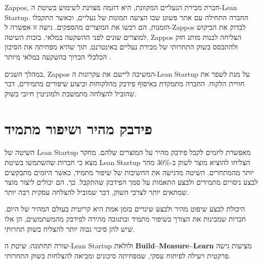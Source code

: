 Zappos, חברת מכירת הנעליים המקוונת, היא דוגמה מצוינת לשימוש בשיטת ה-Lean Startup. החברה התחילה עם אתר פשוט שבו הציעה תמונות של נעליים, וכאשר התקבלו הזמנות, הם רכשו את המוצרים מהספקים. גישה זו אפשרה ל-Zappos לבדוק את הביקוש למוצרים שונים לפני ההשקעה במלאי. בזכות השיטה, Zappos הצליחה לבנות מותג חזק ולהתבסס בשוק התחרותי של מכירת נעליים באינטרנט, תוך שהיא מפחיתה את הסיכון הכלכלי הכרוך בהשקעה במלאי מיותר \cite{blank2013startup}.

במהלך השנים, Zappos המשיכה ליישם את עקרונות ה-Lean Startup על מנת לשפר את חוויית הלקוח. החברה מתמקדת באיסוף פידבק מהלקוחות וביצוע שיפורים מתמידים, דבר שהוביל להצלחה מתמשכת ולמוניטין חיובי בשוק.

\section{פידבק מהיר ושיפור מתמיד}

השיטה של Lean Startup מאפשרת ליזמים לקבל פידבק מהיר על המוצרים שלהם. מחקר מצא כי חברות שהשתמשו בשיטת Lean Startup הצליחו להוציא מוצר לשוק ב-30\% מהר יותר מהמתחרים. השיטה מדגישה את החשיבות של שיפור מתמיד, כאשר היזמים מתבקשים לבצע ניסויים מתמידים ולבצע התאמות על סמך הפידבק שהתקבל. כך, הם יכולים ליצור מוצר שמתאים יותר לצרכי השוק, דבר שמוביל להצלחה עסקית רבה יותר.

היכולת לבצע שיפוט מהיר ולבצע שינויים בזמן אמת היא קריטית בעולם המהיר של היום. חברות שמבינות את הצורך בשיפור מתמיד ובתגובה מהירה לפידבק מהמשתמשים, הן אלו שיש להן סיכוי גבוה יותר להצליח בשוק תחרותי.

\begin{takeaway}
שורה תחתונה: שיטת ה-Lean Startup ולולאת \textbf{Build–Measure–Learn} מציעות גישה פרקטית ויעילה לפיתוח עסקי, שמפחיתה סיכונים ומביאה להצלחות בשוק התחרותי.
\end{takeaway}
